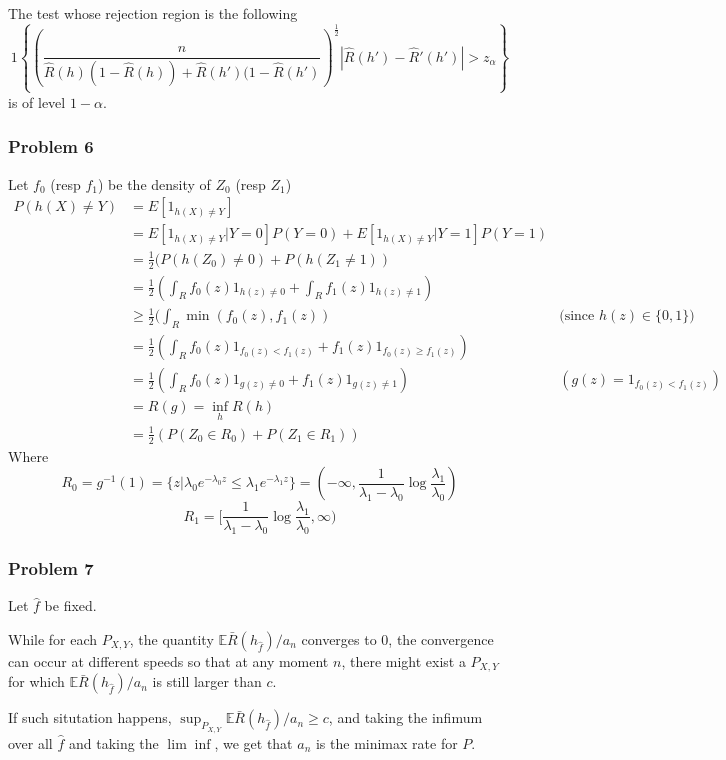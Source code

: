 \documentclass[12pt]{article}
\newcommand{\Q}[1]{\subsubsection*{Problem #1}}
\begin{document}
The test whose rejection region is the following 
$$1\left\{ \left(\frac n {\hat R(h)(1-\hat R(h))+\hat R(h')(1-\hat R(h')}\right)^{\frac12} |\hat R(h') - \hat R'(h')| > z_\alpha\right\}$$
is of level $1-\alpha$.

\Q{6}
Let $f_0$ (resp $f_1$) be the density of $Z_0$ (resp $Z_1$)
\begin{align*}
  P(h(X) \ne Y) &= E[1_{h(X) \ne Y}]
  \\ &= E[1_{h(X) \ne Y} | Y = 0] P(Y = 0) + E[1_{h(X) \ne Y} | Y = 1] P(Y = 1)
  \\ &= \frac12 (P(h(Z_0) \ne 0) + P(h(Z_1 \ne 1))
  \\ &= \frac12 (\int_R f_0(z) 1_{h(z) \ne 0} + \int_R f_1(z) 1_{h(z) \ne 1})
  \\ &\ge \frac12 (\int_R \min(f_0(z), f_1(z)) &\text{(since $h(z) \in \{0,1\}$)}
  \\ &= \frac12 (\int_R f_0(z) 1_{f_0(z) < f_1(z)}+  f_1(z) 1_{f_0(z) \ge f_1(z)})
  \\ &= \frac12 (\int_R f_0(z) 1_{g(z) \ne 0}+  f_1(z) 1_{g(z) \ne 1}) &(g(z) = 1_{f_0(z) < f_1(z)})
  \\&= R(g) = \inf_h R(h)
  \\&= \frac12 (P(Z_0 \in R_0) + P(Z_1 \in R_1))
\end{align*}
Where
$$R_0 = g^{-1}(1) = \{z | \lambda_0 e^{-\lambda_0 z} \le \lambda_1 e^{-\lambda_1 z} \} = (-\infty, \frac1{\lambda_1 - \lambda_0} \log \frac{\lambda_1}{\lambda_0})$$
$$R_1 = [\frac1{\lambda_1 - \lambda_0} \log \frac{\lambda_1}{\lambda_0} , \infty)$$


\Q{7}

Let $\hat f$ be fixed.

While for each $P_{X,Y}$, the quantity $\mathbb E \bar R(h_{\hat f}) / a_n$ converges to 0, the convergence can occur at different speeds so that at any moment $n$, there might exist a $P_{X,Y}$ for which $\mathbb E \bar R(h_{\hat f}) / a_n$ is still larger than $c$. 

If such situtation happens, $\sup_{P_{X,Y}} \mathbb E \bar R(h_{\hat f}) / a_n \ge c$, and taking the infimum over all $\hat f$ and taking the $\lim \inf$, we get that $a_n$ is the minimax rate for $P$.
\end{document}
